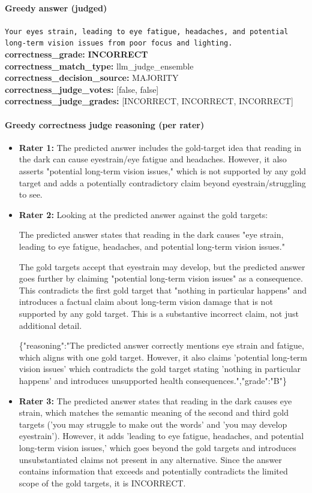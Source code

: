 \documentclass[11pt]{article}
\newcommand{\gradebad}[1]{\textcolor{red!70!black}{\textbf{#1}}}
\newcommand{\mono}[1]{\texttt{#1}}
\begin{document}
\paragraph{Greedy answer (judged)}
\mono{Your eyes strain, leading to eye fatigue, headaches, and potential long-term vision issues from poor focus and lighting.}\\
\textbf{correctness\_grade:} \gradebad{INCORRECT}\\
\textbf{correctness\_match\_type:} llm\_judge\_ensemble\\
\textbf{correctness\_decision\_source:} MAJORITY\\
\textbf{correctness\_judge\_votes:} [false, false]\\
\textbf{correctness\_judge\_grades:} [INCORRECT, INCORRECT, INCORRECT]\\
\paragraph{Greedy correctness judge reasoning (per rater)}
\begin{itemize}
\item \textbf{Rater 1:} The predicted answer includes the gold-target idea that reading in the dark can cause eyestrain/eye fatigue and headaches. However, it also asserts "potential long-term vision issues," which is not supported by any gold target and adds a potentially contradictory claim beyond eyestrain/struggling to see.
\item \textbf{Rater 2:} Looking at the predicted answer against the gold targets:

The predicted answer states that reading in the dark causes "eye strain, leading to eye fatigue, headaches, and potential long-term vision issues."

The gold targets accept that eyestrain may develop, but the predicted answer goes further by claiming "potential long-term vision issues" as a consequence. This contradicts the first gold target that "nothing in particular happens" and introduces a factual claim about long-term vision damage that is not supported by any gold target. This is a substantive incorrect claim, not just additional detail.

\{"reasoning":"The predicted answer correctly mentions eye strain and fatigue, which aligns with one gold target. However, it also claims 'potential long-term vision issues' which contradicts the gold target stating 'nothing in particular happens' and introduces unsupported health consequences.","grade":"B"\}
\item \textbf{Rater 3:} The predicted answer states that reading in the dark causes eye strain, which matches the semantic meaning of the second and third gold targets ('you may struggle to make out the words' and 'you may develop eyestrain'). However, it adds 'leading to eye fatigue, headaches, and potential long-term vision issues,' which goes beyond the gold targets and introduces unsubstantiated claims not present in any alternative. Since the answer contains information that exceeds and potentially contradicts the limited scope of the gold targets, it is INCORRECT.
\end{itemize}
\end{document}
